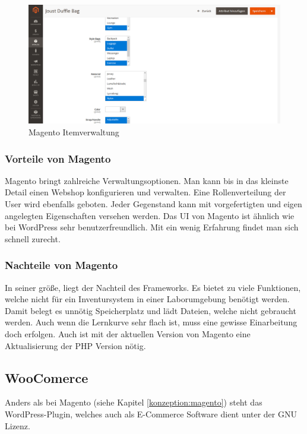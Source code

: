 \begin{figure}[bh]
	\centering
	\includegraphics[scale=0.35]{content/pictures/magento.png}
	\caption{Magento Itemverwaltung}
	\label{fig:magento}
\end{figure}

\subsubsection{Vorteile von Magento}
Magento bringt zahlreiche Verwaltungsoptionen. Man kann bis in das kleinste Detail einen Webshop konfigurieren und verwalten. Eine Rollenverteilung der User wird ebenfalls geboten. Jeder Gegenstand kann mit vorgefertigten und eigen angelegten Eigenschaften versehen werden. Das \ac{UI} von Magento ist ähnlich wie bei WordPress sehr benutzerfreundlich. Mit ein wenig Erfahrung findet man sich schnell zurecht. \autocite{Koch.2012}

\subsubsection{Nachteile von Magento}
In seiner größe, liegt der Nachteil des Frameworks. Es bietet zu viele Funktionen, welche nicht für ein Inventursystem in einer Laborumgebung benötigt werden. Damit belegt es unnötig Speicherplatz und lädt Dateien, welche nicht gebraucht werden. Auch wenn die Lernkurve sehr flach ist, muss eine gewisse Einarbeitung doch erfolgen. Auch ist mit der aktuellen Version von Magento eine Aktualisierung der \ac{PHP} Version nötig. \autocite{Koch.2012}

\subsection{WooComerce}
Anders als bei Magento (siehe Kapitel \ref{konzeption:magento}) steht das WordPress-Plugin, welches auch als E-Commerce Software dient unter der \ac{GNU} Lizenz. 

